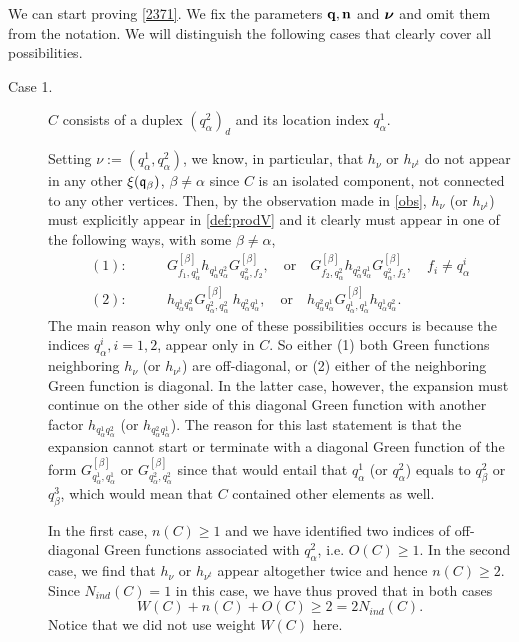 \documentclass[draft]{article}
\newcommand{\bq}{{\bf {q}}}
\newcommand{\bn}{{\bf{n}}}
\newcommand{\fq}{{\frak q}}
\newcommand{\bnu}{\mbox{\boldmath $\nu$}}
\newcommand{\al}{\alpha}
\newcommand{\be}{\begin{equation}}
\newcommand{\ee}{\end{equation}}
\numberwithin{equation}{section}
\numberwithin{theorem}{section}
\numberwithin{definition}{section}
\numberwithin{remark}{section}
\begin{document}
We  can start proving  \eqref{2371}. We fix the parameters
$\bq, \bn$ and $\bnu$ and omit them from the notation.
We  will distinguish the following
cases that clearly cover all possibilities.

\newcommand{\sbe}{{[\beta]}}


\begin{description}

\item[ Case 1.]  $C$ consists  of
 a duplex $(q^2_\alpha)_d$ and 
 its location index $q^1_\alpha$. 

Setting $\nu:=(q_\al^1, q_\al^2)$, we know,
in particular, that  $h_\nu$ or $h_{\nu^t}$
do not appear in any other $\xi(\fq_\beta)$, $\beta\ne \al$
since $C$ is an isolated component, not connected 
to any other vertices.
Then,  by the observation made in \eqref{obs},
  $h_\nu$ (or  $h_ {\nu^t}$)
must explicitly appear in \eqref{def:prodV} and it
clearly  must appear in one of the following ways, with some $\beta\ne \al$,
\begin{align} 
(1):&  \qquad   G_{f_1, q^1_\alpha}^\sbe   h_ {q^1_\alpha  q^2_\alpha}
 G_{q^2_\alpha, f_2}^\sbe,
 \quad \mbox{or} \quad  G_{f_2, q^2_\alpha}^\sbe   h_ {q^2_\alpha  q^1_\alpha}
 G_{q^2_\alpha, f_2}^\sbe, \quad f_i \not = q^i_\alpha \\
(2):&     \qquad  h_ {q^1_\alpha  q^2_\alpha} G_{q^2_\alpha, q^2_\alpha}^\sbe \
 h_ {q^2_\alpha  q^1_\alpha}, \quad \mbox{or} \quad
 h_ {q^2_\alpha  q^1_\alpha} G_{q^1_\alpha, q^1_\alpha}^\sbe  h_ {q^1_\alpha  q^2_\alpha}. 
\end{align}
The main reason why only one of these  possibilities
 occurs is because the indices $q^i_\al, i = 1, 2$, appear only in $C$. 
So  either (1) both Green functions neighboring $ h_\nu$ (or $h_{\nu^t}$)
are off-diagonal, or (2)  either of the neighboring Green function is diagonal.
In the latter case, however, the expansion must continue on the
other side of this diagonal Green function with another factor
 $ h_ {q^1_\alpha  q^2_\alpha}$ (or $h_ {q^2_\alpha  q^1_\alpha}$).
The reason for this last statement is
 that the expansion cannot start or terminate with 
a diagonal Green function of the form $ G_{q^1_\alpha, q^1_\alpha}^\sbe$
or $ G_{q^2_\alpha, q^2_\alpha}^\sbe$ since that would entail that $q_\al^1$ (or
$q_\al^2$) equals to $q^2_\beta$ or $q^3_\beta$, which would mean
that $C$ contained other elements as well.


In the first  case, $n(C) \ge 1$ and we have identified two indices of 
off-diagonal Green functions associated with $q^2_\alpha$, i.e. $O(C)\ge 1$.
In the second case, 
we find that $h_\nu$ or $h_{\nu^t}$ appear altogether
 twice and hence  $n(C) \ge 2$. Since $N_{ind}(C)=1$ in this case,
we have thus proved that in both cases 
\be\label{234}
W(C)+  n(C) +  O(C) \ge   2= 2  N_{ind}(C) .
\ee
Notice that we did not use weight $W(C)$ here. 
 



\end{description}
\end{document}
